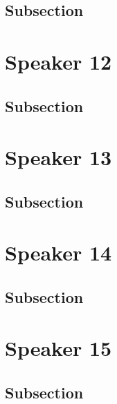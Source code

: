 \documentclass[
]{book}
\begin{document}
\hypertarget{subsection-4}{%
\section{Subsection}\label{subsection-4}}

\hypertarget{speaker-12}{%
\chapter*{Speaker 12}\label{speaker-12}}

\hypertarget{subsection-5}{%
\section{Subsection}\label{subsection-5}}

\hypertarget{speaker-13}{%
\chapter*{Speaker 13}\label{speaker-13}}

\hypertarget{subsection-6}{%
\section{Subsection}\label{subsection-6}}

\hypertarget{speaker-14}{%
\chapter*{Speaker 14}\label{speaker-14}}

\hypertarget{subsection-7}{%
\section{Subsection}\label{subsection-7}}

\hypertarget{speaker-15}{%
\chapter*{Speaker 15}\label{speaker-15}}

\hypertarget{subsection-8}{%
\section{Subsection}\label{subsection-8}}
\end{document}
